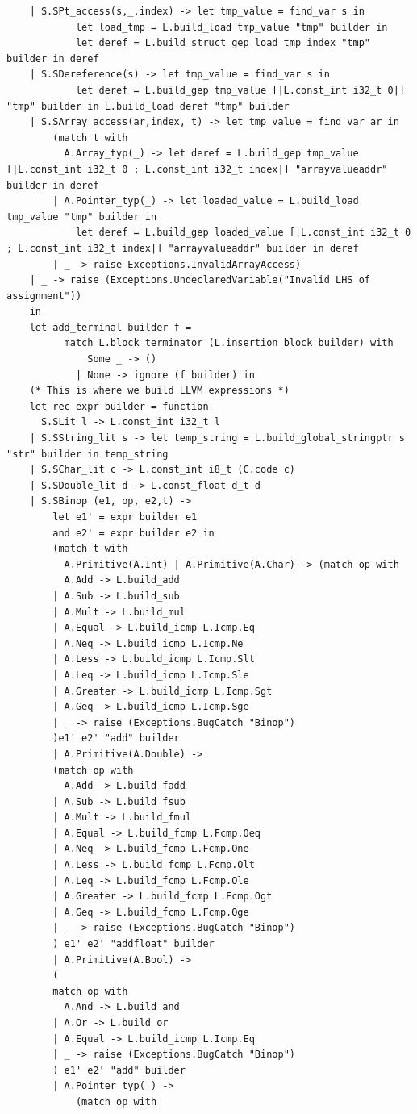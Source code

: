 \documentclass{article}
\begin{document}
\begin{lstlisting}
	| S.SPt_access(s,_,index) -> let tmp_value = find_var s in 
			let load_tmp = L.build_load tmp_value "tmp" builder in 
			let deref = L.build_struct_gep load_tmp index "tmp" builder in deref
	| S.SDereference(s) -> let tmp_value = find_var s in 
			let deref = L.build_gep tmp_value [|L.const_int i32_t 0|] "tmp" builder in L.build_load deref "tmp" builder
	| S.SArray_access(ar,index, t) -> let tmp_value = find_var ar in 
		(match t with 
		  A.Array_typ(_) -> let deref = L.build_gep tmp_value [|L.const_int i32_t 0 ; L.const_int i32_t index|] "arrayvalueaddr" builder in deref 
		| A.Pointer_typ(_) -> let loaded_value = L.build_load tmp_value "tmp" builder in 
			let deref = L.build_gep loaded_value [|L.const_int i32_t 0 ; L.const_int i32_t index|] "arrayvalueaddr" builder in deref 
		| _ -> raise Exceptions.InvalidArrayAccess)
	| _ -> raise (Exceptions.UndeclaredVariable("Invalid LHS of assignment"))
	in 
	let add_terminal builder f =
          match L.block_terminator (L.insertion_block builder) with
        	  Some _ -> ()
      		| None -> ignore (f builder) in	
	(* This is where we build LLVM expressions *)
	let rec expr builder = function 
	  S.SLit l -> L.const_int i32_t l
	| S.SString_lit s -> let temp_string = L.build_global_stringptr s "str" builder in temp_string 
	| S.SChar_lit c -> L.const_int i8_t (C.code c)
	| S.SDouble_lit d -> L.const_float d_t d
	| S.SBinop (e1, op, e2,t) -> 
		let e1' = expr builder e1 
		and e2' = expr builder e2 in
		(match t with 
		  A.Primitive(A.Int) | A.Primitive(A.Char) -> (match op with 
		  A.Add -> L.build_add 
		| A.Sub -> L.build_sub
		| A.Mult -> L.build_mul
		| A.Equal -> L.build_icmp L.Icmp.Eq
		| A.Neq -> L.build_icmp L.Icmp.Ne
		| A.Less -> L.build_icmp L.Icmp.Slt
		| A.Leq -> L.build_icmp L.Icmp.Sle
		| A.Greater -> L.build_icmp L.Icmp.Sgt
		| A.Geq -> L.build_icmp L.Icmp.Sge
		| _ -> raise (Exceptions.BugCatch "Binop")		
		)e1' e2' "add" builder
		| A.Primitive(A.Double) ->
		(match op with 
		  A.Add -> L.build_fadd 
		| A.Sub -> L.build_fsub
		| A.Mult -> L.build_fmul
		| A.Equal -> L.build_fcmp L.Fcmp.Oeq
		| A.Neq -> L.build_fcmp L.Fcmp.One
		| A.Less -> L.build_fcmp L.Fcmp.Olt
		| A.Leq -> L.build_fcmp L.Fcmp.Ole
		| A.Greater -> L.build_fcmp L.Fcmp.Ogt
		| A.Geq -> L.build_fcmp L.Fcmp.Oge
		| _ -> raise (Exceptions.BugCatch "Binop")
		) e1' e2' "addfloat" builder
		| A.Primitive(A.Bool) -> 
		(
		match op with 
		  A.And -> L.build_and
		| A.Or -> L.build_or
		| A.Equal -> L.build_icmp L.Icmp.Eq
		| _ -> raise (Exceptions.BugCatch "Binop")
		) e1' e2' "add" builder	
		| A.Pointer_typ(_) ->
			(match op with

\end{lstlisting}
\end{document}
